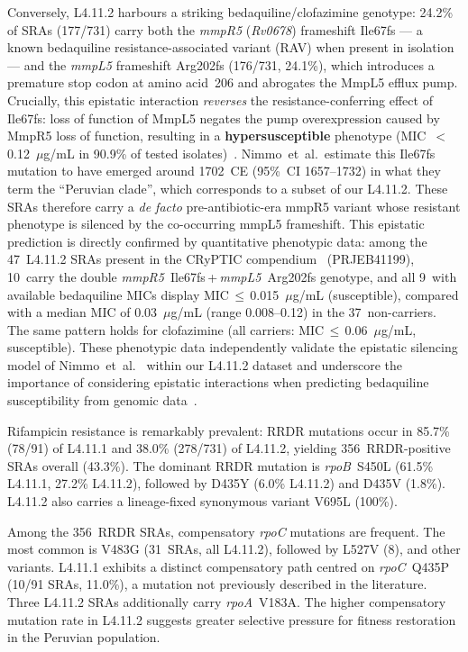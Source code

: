 \documentclass[11pt,a4paper]{article}
\newcommand{\lignee}[1]{\textsf{#1}}
\begin{document}
Conversely, \lignee{L4.11.2} harbours a striking bedaquiline/clofazimine
genotype: 24.2\% of SRAs (177/731) carry both the \textit{mmpR5}
(\textit{Rv0678}) frameshift Ile67fs --- a known bedaquiline
resistance-associated variant (RAV) when present in isolation~\cite{andries2014} --- and the
\textit{mmpL5} frameshift Arg202fs (176/731, 24.1\%), which introduces
a premature stop codon at amino acid~206 and abrogates the MmpL5 efflux
pump.
Crucially, this epistatic interaction \textit{reverses} the
resistance-conferring effect of Ile67fs: loss of function of MmpL5
negates the pump overexpression caused by MmpR5 loss of function,
resulting in a \textbf{hypersusceptible} phenotype
(MIC~$<$\,0.12~$\mu$g/mL in 90.9\% of tested isolates)~\cite{nimmo2024}.
Nimmo~et~al.\ estimate this Ile67fs mutation to have emerged around
1702~CE (95\%~CI 1657--1732) in what they term the ``Peruvian clade'',
which corresponds to a subset of our \lignee{L4.11.2}.
These SRAs therefore carry a \textit{de facto} pre-antibiotic-era
mmpR5 variant whose resistant phenotype is silenced by the co-occurring
mmpL5 frameshift.
This epistatic prediction is directly confirmed by quantitative
phenotypic data: among the 47~\lignee{L4.11.2} SRAs present in the
CRyPTIC compendium~\cite{cryptic2022} (PRJEB41199), 10~carry the
double \textit{mmpR5}~Ile67fs\,+\,\textit{mmpL5}~Arg202fs genotype,
and all 9~with available bedaquiline MICs display
MIC\,$\leq$\,0.015~$\mu$g/mL (susceptible), compared with a median
MIC of 0.03~$\mu$g/mL (range 0.008--0.12) in the 37~non-carriers.
The same pattern holds for clofazimine (all carriers:
MIC\,$\leq$\,0.06~$\mu$g/mL, susceptible).  These phenotypic data
independently validate the epistatic silencing model of
Nimmo~et~al.~\cite{nimmo2024} within our \lignee{L4.11.2} dataset
and underscore the importance of considering epistatic
interactions when predicting bedaquiline susceptibility from genomic
data~\cite{nimmo2024,vargas2023}.

Rifampicin resistance is remarkably prevalent: RRDR mutations occur in
85.7\% (78/91) of \lignee{L4.11.1} and 38.0\% (278/731) of
\lignee{L4.11.2}, yielding 356~RRDR-positive SRAs overall (43.3\%).
The dominant RRDR mutation is \textit{rpoB}~S450L (61.5\% \lignee{L4.11.1},
27.2\% \lignee{L4.11.2}), followed by D435Y (6.0\% \lignee{L4.11.2}) and D435V (1.8\%).
\lignee{L4.11.2} also carries a lineage-fixed synonymous variant V695L
(100\%).

Among the 356~RRDR SRAs, compensatory \textit{rpoC} mutations are
frequent.  The most common is V483G (31~SRAs, all \lignee{L4.11.2}),
followed by L527V (8), and other variants.
\lignee{L4.11.1} exhibits a distinct compensatory path centred on
\textit{rpoC}~Q435P (10/91 SRAs, 11.0\%), a mutation not previously
described in the literature.  Three \lignee{L4.11.2}
SRAs additionally carry \textit{rpoA}~V183A.
The higher compensatory mutation rate in \lignee{L4.11.2} suggests
greater selective pressure for fitness restoration in the Peruvian
population.
\end{document}
